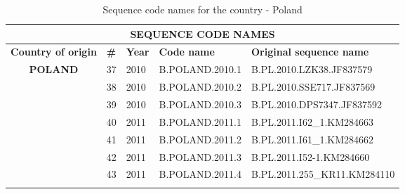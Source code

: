 \begin{table}[htbp]
    \caption{Sequence code names for the country - Poland}
    \centering
\begin{tabular}{|cllll|}
\hline
\multicolumn{5}{|c|}{\textbf{SEQUENCE   CODE NAMES}}                                                                                                                                                        \\ \hline
\multicolumn{1}{|l|}{\textbf{Country   of origin}}      & \multicolumn{1}{l|}{\textbf{\#}} & \multicolumn{1}{r|}{\textbf{Year}} & \multicolumn{1}{l|}{\textbf{Code name}} & \textbf{Original sequence name} \\ \hline
\multicolumn{1}{|c|}{\multirow{26}{*}{\textbf{POLAND}}} & \multicolumn{1}{l|}{37}          & \multicolumn{1}{l|}{2010}          & \multicolumn{1}{l|}{B.POLAND.2010.1}    & B.PL.2010.LZK38.JF837579        \\ \cline{2-5} 
\multicolumn{1}{|c|}{}                                  & \multicolumn{1}{l|}{38}          & \multicolumn{1}{l|}{2010}          & \multicolumn{1}{l|}{B.POLAND.2010.2}    & B.PL.2010.SSE717.JF837569       \\ \cline{2-5} 
\multicolumn{1}{|c|}{}                                  & \multicolumn{1}{l|}{39}          & \multicolumn{1}{l|}{2010}          & \multicolumn{1}{l|}{B.POLAND.2010.3}    & B.PL.2010.DPS7347.JF837592      \\ \cline{2-5} 
\multicolumn{1}{|c|}{}                                  & \multicolumn{1}{l|}{40}          & \multicolumn{1}{l|}{2011}          & \multicolumn{1}{l|}{B.POLAND.2011.1}    & B.PL.2011.I62\_1.KM284663       \\ \cline{2-5} 
\multicolumn{1}{|c|}{}                                  & \multicolumn{1}{l|}{41}          & \multicolumn{1}{l|}{2011}          & \multicolumn{1}{l|}{B.POLAND.2011.2}    & B.PL.2011.I61\_1.KM284662       \\ \cline{2-5} 
\multicolumn{1}{|c|}{}                                  & \multicolumn{1}{l|}{42}          & \multicolumn{1}{l|}{2011}          & \multicolumn{1}{l|}{B.POLAND.2011.3}    & B.PL.2011.I52-1.KM284660        \\ \cline{2-5} 
\multicolumn{1}{|c|}{}                                  & \multicolumn{1}{l|}{43}          & \multicolumn{1}{l|}{2011}          & \multicolumn{1}{l|}{B.POLAND.2011.4}    & B.PL.2011.255\_KR11.KM284110    \\ \cline{2-5} 

\end{tabular}
\end{table}
